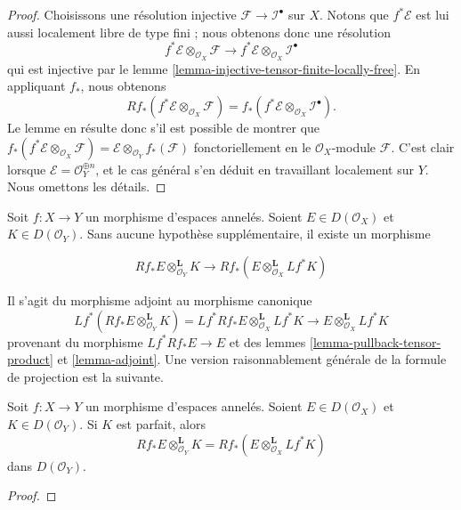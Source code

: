 {\begin{proof}
Choisissons une résolution injective $\mathcal{F} \to \mathcal{I}^\bullet$ sur $X$. Notons que $f^*\mathcal{E}$ est lui aussi localement libre de type fini ; nous obtenons donc une résolution $$
f^*\mathcal{E} \otimes_{\mathcal{O}_X} \mathcal{F}
\longrightarrow
f^*\mathcal{E} \otimes_{\mathcal{O}_X} \mathcal{I}^\bullet
$$ qui est injective par le lemme \ref{lemma-injective-tensor-finite-locally-free}. En appliquant $f_*$, nous obtenons $$
Rf_*(f^*\mathcal{E} \otimes_{\mathcal{O}_X} \mathcal{F})
=
f_*(f^*\mathcal{E} \otimes_{\mathcal{O}_X} \mathcal{I}^\bullet).
$$ Le lemme en résulte donc s'il est possible de montrer que $f_*(f^*\mathcal{E} \otimes_{\mathcal{O}_X} \mathcal{F}) =
\mathcal{E} \otimes_{\mathcal{O}_Y} f_*(\mathcal{F})$ fonctoriellement en le $\mathcal{O}_X$-module $\mathcal{F}$. C'est clair lorsque $\mathcal{E} = \mathcal{O}_Y^{\oplus n}$, et le cas général s'en déduit en travaillant localement sur $Y$. Nous omettons les détails.
\end{proof}
\noindent

Soit $f : X \to Y$ un morphisme d'espaces annelés. Soient $E \in D(\mathcal{O}_X)$ et $K \in D(\mathcal{O}_Y)$. Sans aucune hypothèse supplémentaire, il existe un morphisme

\begin{equation}
\label{equation-projection-formula-map}
Rf_*E \otimes^\mathbf{L}_{\mathcal{O}_Y} K
\longrightarrow
Rf_*(E \otimes^\mathbf{L}_{\mathcal{O}_X} Lf^*K)
\end{equation}

Il s'agit du morphisme adjoint au morphisme canonique
$$
Lf^*(Rf_*E \otimes^\mathbf{L}_{\mathcal{O}_Y} K) =
Lf^*Rf_*E \otimes^\mathbf{L}_{\mathcal{O}_X} Lf^*K
\longrightarrow
E \otimes^\mathbf{L}_{\mathcal{O}_X} Lf^*K
$$
provenant du morphisme $Lf^*Rf_*E \to E$ et des lemmes
\ref{lemma-pullback-tensor-product} et \ref{lemma-adjoint}. Une version raisonnablement générale de la formule de projection est la suivante.

\begin{lemma}

\label{lemma-projection-formula-perfect}
Soit $f : X \to Y$ un morphisme d'espaces annelés. Soient $E \in D(\mathcal{O}_X)$ et $K \in D(\mathcal{O}_Y)$. Si $K$ est parfait, alors $$
Rf_*E \otimes^\mathbf{L}_{\mathcal{O}_Y} K =
Rf_*(E \otimes^\mathbf{L}_{\mathcal{O}_X} Lf^*K)
$$ dans $D(\mathcal{O}_Y)$.
\end{lemma}

\begin{proof}


\end{proof}}

